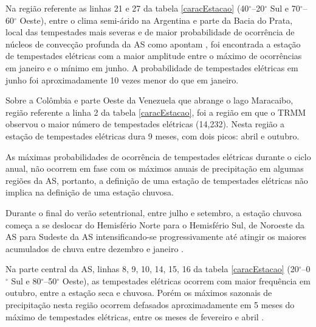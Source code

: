  

Na região referente as linhas 21 e 27 da tabela \ref{caracEstacao} (40$^{\circ}$--20$^{\circ}$ Sul e 70$^{\circ}$--60$^{\circ}$ Oeste),  entre o clima semi-árido na Argentina e parte da Bacia do Prata,  local das tempestades mais severas e de maior probabilidade de ocorrência de núcleos de convecção profunda da AS como apontam , foi encontrada a estação de tempestades elétricas com a maior amplitude entre o máximo de ocorrências em janeiro e o mínimo em junho. A probabilidade de tempestades elétricas em junho foi aproximadamente 10 vezes menor do que em janeiro.

Sobre a Colômbia e parte Oeste da Venezuela que abrange o lago Maracaibo, região referente a linha 2 da tabela \ref{caracEstacao}, foi a região em que o TRMM observou o maior número de tempestades elétricas (14,232). Nesta região a estação de tempestades elétricas dura  9 meses, com dois picos: abril e outubro.


As máximas probabilidades de ocorrência de tempestades elétricas durante o ciclo anual, não ocorrem em fase com os máximos anuais de precipitação em algumas regiões da AS, portanto, a definição de uma estação de tempestades elétricas não implica na definição de uma estação chuvosa. 

Durante o final do verão setentrional, entre julho e setembro, a estação chuvosa começa a se deslocar do Hemisfério Norte para o Hemisfério Sul, de Noroeste da AS para Sudeste da AS intensificando-se progressivamente até atingir os maiores acumulados de chuva entre dezembro e janeiro \cite{grimm2003nino,reboita2010regimes,Marengo2012,shi-atlas,bombardi2008variabilidade,cusdodioTese}.
 
Na parte central da AS, linhas  8, 9, 10, 14, 15, 16 da tabela \ref{caracEstacao} (20$^{\circ}$--0$^{\circ}$ Sul e 80$^{\circ}$--50$^{\circ}$ Oeste), as tempestades elétricas ocorrem com maior frequência em outubro, entre a estação seca e chuvosa. Porém os máximos sazonais de precipitação nesta região ocorrem defasados aproximadamente em 5 meses do máximo de tempestades elétricas, entre os meses de fevereiro e abril \cite{grimm2003nino,reboita2010regimes,shi-atlas,bombardi2008variabilidade,cusdodioTese}.


